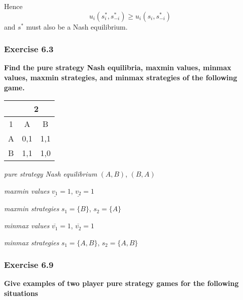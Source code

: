 \documentclass[12pt, a4paper]{article}
\begin{document}
	Hence
	\[ u_i(s_i^*, s_{-i}^*) \geq u_i(s_i, s_{-i}^*) \]
	and $s^*$ must also be a Nash equilibrium.
	
	\subsubsection*{Exercise 6.3}

	\textbf{Find the pure strategy Nash equilibria, maxmin values, minmax values, maxmin strategies, and minmax strategies of the following game.}
	
	\begin{table}[ht!]
		\centering
		\begin{tabular}{|c|c|c|} \hline
			& \multicolumn{2}{|c|}{2} \\ \hline
			1 & A & B \\ \hline
			A & 0,1 & 1,1 \\ \hline
			B & 1,1 & 1,0 \\ \hline
		\end{tabular}
	\end{table}
	
	\textit{pure strategy Nash equilibrium} $(A,B)$, $(B,A)$
	
	\textit{maxmin values} $\underline{v_1}=1$, $\underline{v_2}=1$
	
	\textit{maxmin strategies} $s_1=\{B\}$, $s_2=\{A\}$
	
	\textit{minmax values} $\overline{v_1}=1$, $\overline{v_2}=1$
	
	\textit{minmax strategies} $s_1=\{A, B\}$, $s_2=\{A,B\}$
	
	
	\subsubsection*{Exercise 6.9}
	
	\textbf{Give examples of two player pure strategy games for the following situations}
	
\end{document}

